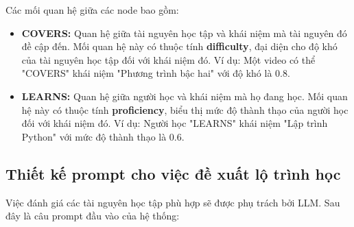 Các mối quan hệ giữa các node bao gồm:
\begin{itemize}
    \item \textbf{COVERS:} Quan hệ giữa tài nguyên học tập và khái niệm mà tài nguyên đó đề cập đến. Mối quan hệ này có thuộc tính \textbf{difficulty}, đại diện cho độ khó của tài nguyên học tập đối với khái niệm đó. Ví dụ: Một video có thể "COVERS" khái niệm "Phương trình bậc hai" với độ khó là 0.8.
    \item \textbf{LEARNS:} Quan hệ giữa người học và khái niệm mà họ đang học. Mối quan hệ này có thuộc tính \textbf{proficiency}, biểu thị mức độ thành thạo của người học đối với khái niệm đó. Ví dụ: Người học "LEARNS" khái niệm "Lập trình Python" với mức độ thành thạo là 0.6.
\end{itemize}

\subsection{Thiết kế prompt cho việc đề xuất lộ trình học}
Việc đánh giá các tài nguyên học tập phù hợp sẽ được phụ trách bởi LLM. Sau đây là câu prompt đầu vào của hệ thống:

